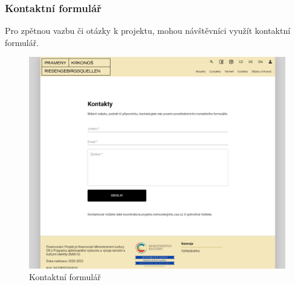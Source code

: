 \subsubsection{Kontaktní formulář}
Pro zpětnou vazbu či otázky k projektu, mohou návštěvníci využít kontaktní formulář.
\begin{figure}[H]
	\centering
	\includegraphics[width=.8\linewidth]{img/contactScene.png}
	\caption{Kontaktní formulář}
\end{figure}

\pagebreak
